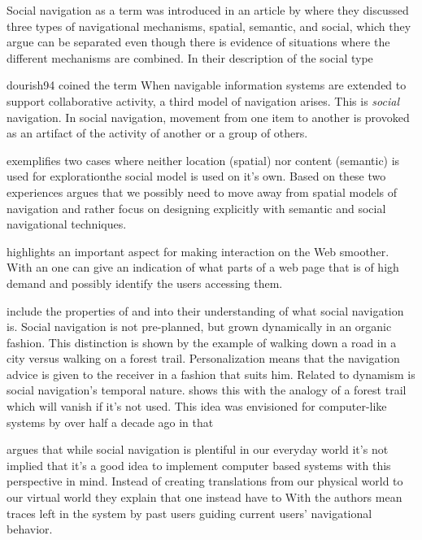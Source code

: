 Social navigation as a term was introduced in an article by
\citet{dourish94} where they discussed three types of navigational mechanisms,
spatial, semantic, and social, which they argue can be separated even though
there is evidence of situations where the different mechanisms are combined.
In their description of the social type
\begin{fullquote}[\p{1}]{dourish94}{%
  coined the term }
    When navigable information systems are extended to support collaborative
    activity, a third model of navigation arises. This is \emph{social}
    navigation. In social navigation, movement from one item to another is
    provoked as an artifact of the activity of another or a group of others.
\end{fullquote}

\citeauthor{dourish94} exemplifies two cases where neither location
(spatial) nor content (semantic) is used for exploration\dash{}the social
model is used on it's own. Based on these two experiences
\citeauthor{dourish94} argues that we possibly need to move away from spatial
models of navigation and rather focus on designing explicitly with semantic
and social navigational techniques.

\citeauthor{dieberger97} highlights an important aspect for making interaction
on the Web smoother. With an
one can give an indication of what parts of a web page that is of high demand
and possibly identify the users accessing them.

\citet[]{dieberger00b} include the properties of 
and  into their understanding of what social navigation is.
Social navigation is not pre-planned, but grown dynamically in an organic
fashion. This distinction is shown by the example of walking down a road in a
city versus walking on a forest trail. Personalization means that the
navigation advice is given to the receiver in a fashion that suits him.
Related to dynamism is social navigation's temporal nature.
\citet[]{dieberger00b} shows this with the analogy of a forest trail
which will vanish if it's not used. This idea was envisioned for computer-like
systems by \citeauthor{bush45} over half a decade ago in that

\citet{svensson05} argues that while social navigation is plentiful in
our everyday world it's not implied that it's a good idea to implement
computer based systems with this perspective in mind. Instead of creating
translations from our physical world to our virtual world
they explain that one instead have to
With  the authors mean traces left in the system by past
users guiding current users' navigational behavior.

